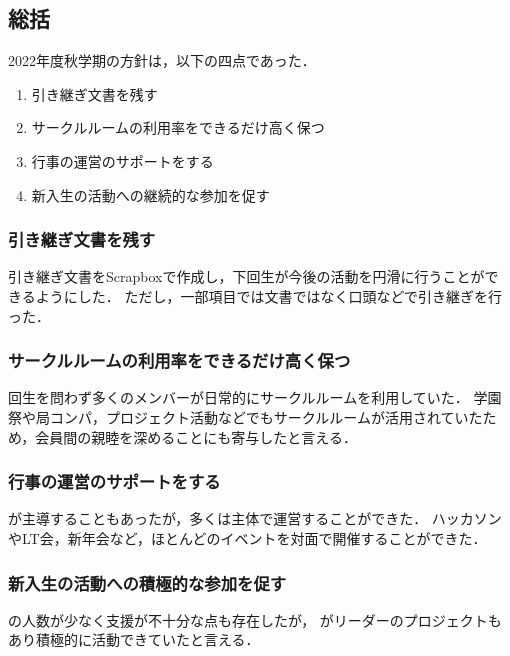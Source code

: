 \subsection*{\thirdGrade{}総括}


2022年度秋学期の\thirdGrade{}方針は，以下の四点であった．

\begin{enumerate}
    \item 引き継ぎ文書を残す
    \item サークルルームの利用率をできるだけ高く保つ
    \item 行事の運営のサポートをする
    \item 新入生の活動への継続的な参加を促す
\end{enumerate}


\subsubsection*{引き継ぎ文書を残す}
引き継ぎ文書をScrapboxで作成し，下回生が今後の活動を円滑に行うことができるようにした．
ただし，一部項目では文書ではなく口頭などで引き継ぎを行った．

\subsubsection*{サークルルームの利用率をできるだけ高く保つ}

回生を問わず多くのメンバーが日常的にサークルルームを利用していた．
学園祭や局コンパ，プロジェクト活動などでもサークルルームが活用されていたため，会員間の親睦を深めることにも寄与したと言える．

\subsubsection*{行事の運営のサポートをする}

\thirdGrade{}が主導することもあったが，多くは\secondGrade{}主体で運営することができた．
ハッカソンやLT会，新年会など，ほとんどのイベントを対面で開催することができた．

\subsubsection*{新入生の活動への積極的な参加を促す}

\secondGrade{}の人数が少なく支援が不十分な点も存在したが，
\firstGrade{}がリーダーのプロジェクトもあり積極的に活動できていたと言える．
